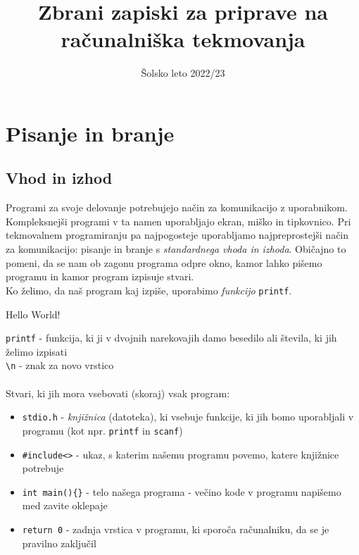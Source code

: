 \documentclass{book}
\title{Zbrani zapiski za priprave na računalniška tekmovanja}
\date{Šolsko leto 2022/23}
\author{}
\begin{document}
\maketitle

\tableofcontents
\newpage

\chapter{Pisanje in branje}

\section{Vhod in izhod}
Programi za svoje delovanje potrebujejo način za komunikacijo z
uporabnikom. Kompleksnejši programi v ta namen uporabljajo ekran, miško
in tipkovnico. Pri tekmovalnem programiranju pa najpogosteje uporabljamo najpreprostejši način za komunikacijo: pisanje in branje s \emph{standardnega vhoda in izhoda}. Običajno to pomeni, da se nam ob zagonu programa odpre okno, kamor lahko pišemo programu in kamor program izpisuje stvari.\\
Ko želimo, da naš program kaj izpiše, uporabimo \emph{funkcijo} \verb+printf+.
\begin{examples}


\begin{inout}
\tcblower
Hello World!
\end{inout}

\end{examples}

\verb+printf+ - funkcija, ki ji v dvojnih narekovajih damo besedilo ali števila, ki jih želimo izpisati\\
\verb+\n+ - znak za novo vrstico
\\\\
Stvari, ki jih mora vsebovati (skoraj) vsak program:
\begin{itemize}
	\item \verb+stdio.h+ - \emph{knjižnica} (datoteka), ki vsebuje funkcije, ki jih bomo uporabljali v programu (kot npr. \verb+printf+ in \verb+scanf+)
	\item \verb+#include<>+ - ukaz, s katerim našemu programu povemo, katere knjižnice potrebuje
	\item \verb+int main(){}+ - telo našega programa - večino kode v programu napišemo med zavite oklepaje
	\item \verb+return 0+ - zadnja vrstica v programu, ki sporoča računalniku, da se je pravilno zaključil
\end{itemize}
\end{document}
